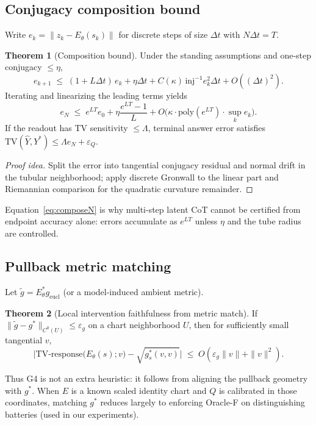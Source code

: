 \documentclass[letterpaper,10pt,twocolumn]{article}
\theoremstyle{definition}
\newtheorem{theorem}{Theorem}
\newcommand{\TV}{\mathrm{TV}}
\begin{document}
\subsection{Conjugacy composition bound}
Write $e_k=\|z_k-E_\theta(s_k)\|$ for discrete steps of size $\Delta t$ with $N\Delta t=T$.
\begin{theorem}[Composition bound]
\label{thm:compose}
Under the standing assumptions and one-step conjugacy $\le\eta$,
\begin{equation}
e_{k+1}
\;\le\;
(1+L\Delta t)\,e_k
+\eta\Delta t
+C(\kappa)\,\mathrm{inj}^{-1}e_k^2\Delta t
+O((\Delta t)^2).
\label{eq:compose}
\end{equation}
Iterating and linearizing the leading terms yields
\begin{equation}
e_N
\;\le\;
e^{LT}e_0
+\eta\frac{e^{LT}-1}{L}
+O\!\big(\kappa\cdot\mathrm{poly}(e^{LT})\cdot\sup_k e_k\big).
\label{eq:composeN}
\end{equation}
If the readout has TV sensitivity $\le\Lambda$, terminal answer error satisfies
$\TV(\hat Y,Y^*)\le\Lambda e_N+\varepsilon_Q$.
\end{theorem}
\begin{proof}[Proof idea]
Split the error into tangential conjugacy residual and normal drift in the tubular neighborhood; apply discrete Gronwall to the linear part and Riemannian comparison for the quadratic curvature remainder.
\end{proof}
Equation~\eqref{eq:composeN} is why multi-step latent CoT cannot be certified from endpoint accuracy alone: errors accumulate as $e^{LT}$ unless $\eta$ and the tube radius are controlled.

\subsection{Pullback metric matching}
Let $\tilde g = E_\theta^* g_{\mathrm{eucl}}$ (or a model-induced ambient metric).
\begin{theorem}[Local intervention faithfulness from metric match]
\label{thm:metric}
If $\|\tilde g-g^*\|_{C^0(U)}\le\varepsilon_g$ on a chart neighborhood $U$, then for sufficiently small tangential $v$,
\begin{equation}
\Big|
\mathrm{TV\textrm{-}response}\big(E_\theta(s);v\big)
-\sqrt{g^*_s(v,v)}
\Big|
\;\le\;
O(\varepsilon_g\|v\|+\|v\|^2).
\label{eq:metric}
\end{equation}
\end{theorem}
Thus G4 is not an extra heuristic: it follows from aligning the pullback geometry with $g^*$.
When $E$ is a known scaled identity chart and $Q$ is calibrated in those coordinates, matching $g^*$ reduces largely to enforcing Oracle-F on distinguishing batteries (used in our experiments).
\end{document}

